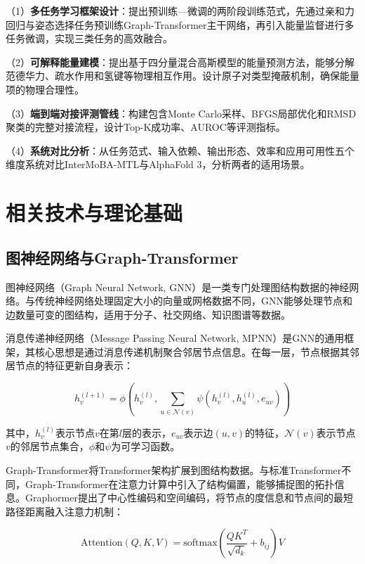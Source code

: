 （1）\textbf{多任务学习框架设计}：提出预训练—微调的两阶段训练范式，先通过亲和力回归与姿态选择任务预训练Graph-Transformer主干网络，再引入能量监督进行多任务微调，实现三类任务的高效融合。

（2）\textbf{可解释能量建模}：提出基于四分量混合高斯模型的能量预测方法，能够分解范德华力、疏水作用和氢键等物理相互作用。设计原子对类型掩蔽机制，确保能量项的物理合理性。

（3）\textbf{端到端对接评测管线}：构建包含Monte Carlo采样、BFGS局部优化和RMSD聚类的完整对接流程，设计Top-K成功率、AUROC等评测指标。

（4）\textbf{系统对比分析}：从任务范式、输入依赖、输出形态、效率和应用可用性五个维度系统对比InterMoBA-MTL与AlphaFold 3，分析两者的适用场景。

\newpage

\section{相关技术与理论基础}
\subsection{图神经网络与Graph-Transformer}

图神经网络（Graph Neural Network, GNN）是一类专门处理图结构数据的神经网络。与传统神经网络处理固定大小的向量或网格数据不同，GNN能够处理节点和边数量可变的图结构，适用于分子、社交网络、知识图谱等数据。

消息传递神经网络（Message Passing Neural Network, MPNN）是GNN的通用框架，其核心思想是通过消息传递机制聚合邻居节点信息。在每一层，节点根据其邻居节点的特征更新自身表示：

\begin{equation}
h_v^{(l+1)} = \phi\left(h_v^{(l)}, \sum_{u \in \mathcal{N}(v)} \psi\left(h_v^{(l)}, h_u^{(l)}, e_{uv}\right)\right)
\end{equation}

其中，$h_v^{(l)}$表示节点$v$在第$l$层的表示，$e_{uv}$表示边$(u,v)$的特征，$\mathcal{N}(v)$表示节点$v$的邻居节点集合，$\phi$和$\psi$为可学习函数。

Graph-Transformer将Transformer架构扩展到图结构数据。与标准Transformer不同，Graph-Transformer在注意力计算中引入了结构偏置，能够捕捉图的拓扑信息。Graphormer提出了中心性编码和空间编码，将节点的度信息和节点间的最短路径距离融入注意力机制：

\begin{equation}
\text{Attention}(Q, K, V) = \text{softmax}\left(\frac{QK^T}{\sqrt{d_k}} + b_{ij}\right)V
\end{equation}

